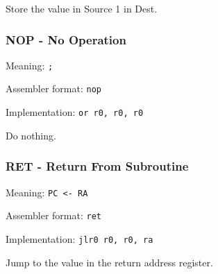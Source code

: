 \documentclass{article}
\begin{document}
Store the value in Source 1 in Dest.

\subsubsection{NOP - No Operation}
Meaning: \verb|;|

Assembler format: \verb|nop|

Implementation: \verb|or r0, r0, r0|

Do nothing.

\subsubsection{RET - Return From Subroutine}
Meaning: \verb|PC <- RA|

Assembler format: \verb|ret|

Implementation: \verb|jlr0 r0, r0, ra|

Jump to the value in the return address register.
\end{document}
